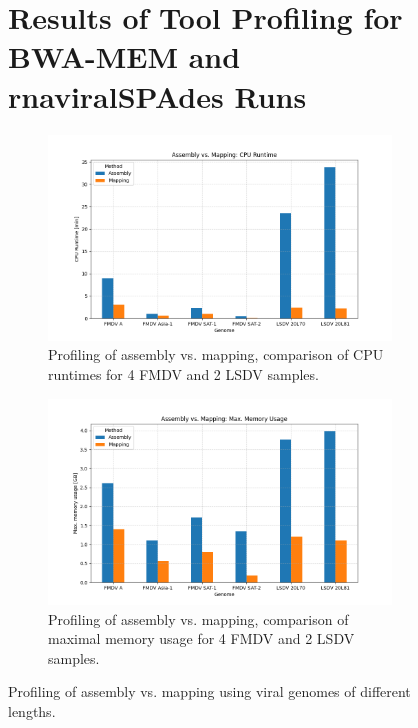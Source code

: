\begin{figure}[ht!]
	\section*{\thesection \quad Results of Tool Profiling for BWA-MEM and rnaviralSPAdes Runs}
    \centering
	\begin{subfigure}[b]{1.0\textwidth}
        \includegraphics[width=1.0\textwidth]{media/4-profiling-cputime.png}
        \caption{Profiling of assembly vs. mapping, comparison of CPU runtimes for 4 FMDV and 2 LSDV samples.}
        \label{fig:4-profiling-cpu}
    \end{subfigure}
	\begin{subfigure}[b]{1.0\textwidth}
        \includegraphics[width=1.0\textwidth]{media/4-profiling-maxmem.png}
        \caption{Profiling of assembly vs. mapping, comparison of maximal memory usage for 4 FMDV and 2 LSDV samples.}
        \label{fig:4-profiling-mem}
    \end{subfigure}
    \caption[Profiling of assembly vs. mapping.]{Profiling of assembly vs. mapping using viral genomes of different lengths.}
\end{figure}
